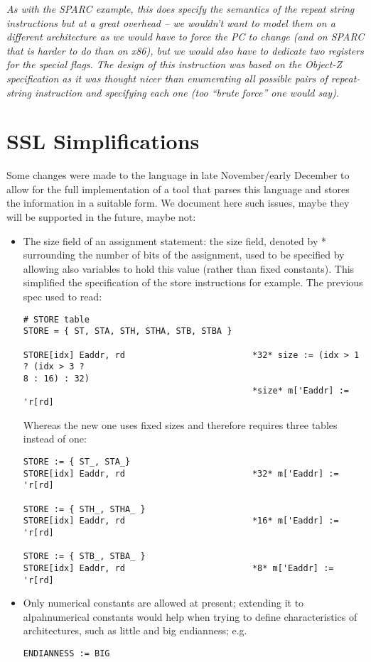{\it
As with the SPARC example, this does specify the semantics of
the repeat string instructions but at a great overhead -- we 
wouldn't want to model them on a different architecture as 
we would have to force the PC to change (and on SPARC that is
harder to do than on x86), but we would also have to dedicate
two registers for the special flags.  
The design of this instruction was based on the Object-Z 
specification as it was thought nicer than enumerating all 
possible pairs of repeat-string instruction and specifying 
each one (too ``brute force'' one would say). 
}



\section{SSL Simplifications}
Some changes were made to the language in late November/early
December to allow for the full implementation of a tool that
parses this language and stores the information in a suitable
form. 
We document here such issues, maybe they will be supported in
the future, maybe not:
\begin{itemize}
\item The size field of an assignment statement: the size field,
	denoted by * surrounding the number of bits of the 
	assignment, used to be specified by allowing also variables
	to hold this value (rather than fixed constants).  This
	simplified the specification of the store instructions for
	example.  The previous spec used to read:
{\small \begin{verbatim}
# STORE table
STORE = { ST, STA, STH, STHA, STB, STBA }

STORE[idx] Eaddr, rd                         *32* size := (idx > 1 ? (idx > 3 ?
8 : 16) : 32)
                                             *size* m['Eaddr] := 'r[rd]
\end{verbatim}
}
	Whereas the new one uses fixed sizes and therefore requires three
	tables instead of one:
{\small \begin{verbatim} 
STORE := { ST_, STA_}
STORE[idx] Eaddr, rd                         *32* m['Eaddr] := 'r[rd]

STORE := { STH_, STHA_ }
STORE[idx] Eaddr, rd                         *16* m['Eaddr] := 'r[rd]

STORE := { STB_, STBA_ }
STORE[idx] Eaddr, rd                         *8* m['Eaddr] := 'r[rd]
\end{verbatim}
}

\item Only numerical constants are allowed at present; extending it to 
alpahnumerical constants would help when trying to define characteristics
of architectures, such as little and big endianness; e.g.
{\small \begin{verbatim}
ENDIANNESS := BIG
\end{verbatim}
}

\end{itemize}



